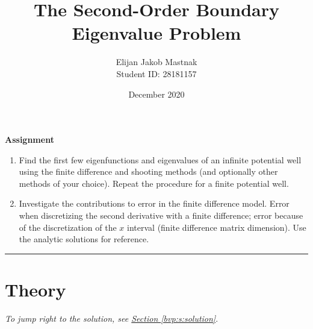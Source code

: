 \documentclass[11pt, a4paper]{article}
\begin{document}
\title{The Second-Order Boundary Eigenvalue Problem}
\author{Elijan Jakob Mastnak\\[1mm]\small{Student ID: 28181157}}
\date{December 2020}
\maketitle

\tableofcontents

\newpage
\begin{center}
\textbf{Assignment}
\begin{enumerate}
	\item Find the first few eigenfunctions and eigenvalues of an infinite potential well using the finite difference and shooting methods (and optionally other methods of your choice). Repeat the procedure for a finite potential well.
	
	\item Investigate the contributions to error in the finite difference model. Error when discretizing the second derivative with a finite difference; error because of the discretization of the $ x $ interval (finite difference matrix dimension). Use the analytic solutions for reference.
	\iffalse
	\item \textit{Optional}: Find the first few eigenfunctions and eigenvalues of the equation
	\begin{equation*}
		\dv[4]{\psi}{x} = E\psi
	\end{equation*}
	on the interval $ x \in [-\frac{a}{2}, \frac{a}{2}] $ with the boundary conditions
	\begin{equation*}
		\psi\big(\pm \tfrac{a}{2}\big) = \psi''\big(\pm \tfrac{a}{2}\big) = 0
	\end{equation*}
	using the finite difference method and diagonalization. Use the finite difference approximation to the fourth derivative:
	\begin{equation*}
		\psi_{i-2} - 4\psi_{i-1} + 6 \psi_{i} - 4\psi_{i+1} + \psi_{i+2} = h^{4}k^{4} \psi_{i} = \lambda \psi_{i}
	\end{equation*}
	where $ E = k^{4} $ and $ \lambda = h^{4}k^{4} $. Expect a difference matrix with 5 non-zero diagonals.
	\fi
\end{enumerate}
\end{center}

\vspace{2mm}

\rule{\textwidth}{0.2pt}

\section{Theory} \label{bvp:s:theory}
\vspace{-2mm}
\textit{To jump right to the solution, see \hyperref[bvp:s:solution]{Section \ref{bvp:s:solution}}}.
\end{document}
